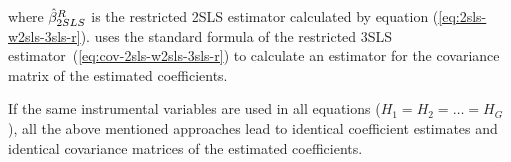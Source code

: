 where $\hat{\beta}^R_{2SLS}$ is the restricted 2SLS estimator calculated
by equation (\ref{eq:2sls-w2sls-3sls-r}).
 uses the standard formula of the restricted 3SLS
estimator~(\ref{eq:cov-2sls-w2sls-3sls-r}) to calculate an estimator
for the covariance matrix of the estimated coefficients.


If the same instrumental variables are used in all equations 
($H_1 = H_2 = \ldots = H_G$), 
all the above mentioned approaches lead to identical coefficient estimates
and identical covariance matrices of the estimated coefficients.

